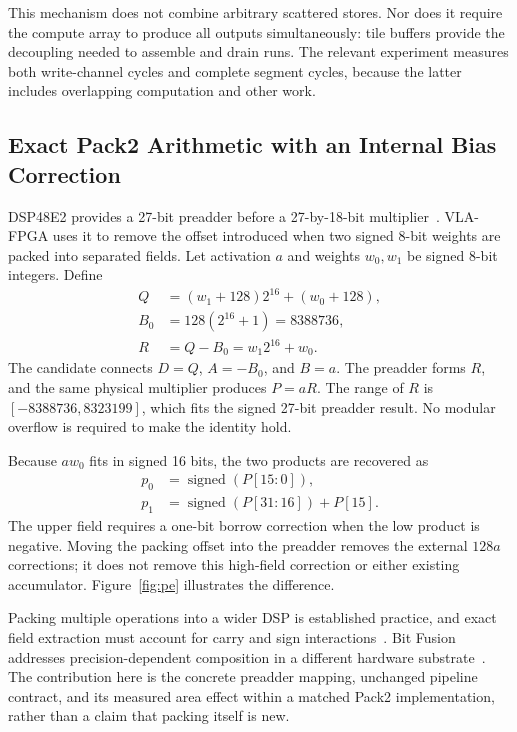 \documentclass[10pt,conference,letterpaper]{IEEEtran}
\begin{document}
This mechanism does not combine arbitrary scattered stores. Nor does it require the compute array to produce all outputs simultaneously: tile buffers provide the decoupling needed to assemble and drain runs. The relevant experiment measures both write-channel cycles and complete segment cycles, because the latter includes overlapping computation and other work.

\subsection{Exact Pack2 Arithmetic with an Internal Bias Correction}
\label{sec:pe}
DSP48E2 provides a 27-bit preadder before a 27-by-18-bit multiplier~\cite{ug579}. VLA-FPGA uses it to remove the offset introduced when two signed 8-bit weights are packed into separated fields. Let activation $a$ and weights $w_0,w_1$ be signed 8-bit integers. Define
\begin{align}
Q&=(w_1+128)2^{16}+(w_0+128),\\
B_0&=128(2^{16}+1)=8388736,\\
R&=Q-B_0=w_1 2^{16}+w_0.
\end{align}
The candidate connects $D=Q$, $A=-B_0$, and $B=a$. The preadder forms $R$, and the same physical multiplier produces $P=aR$. The range of $R$ is $[-8388736,8323199]$, which fits the signed 27-bit preadder result. No modular overflow is required to make the identity hold.

Because $aw_0$ fits in signed 16 bits, the two products are recovered as
\begin{align}
p_0&=\operatorname{signed}(P[15:0]),\\
p_1&=\operatorname{signed}(P[31:16])+P[15].
\label{eq:extract}
\end{align}
The upper field requires a one-bit borrow correction when the low product is negative. Moving the packing offset into the preadder removes the external $128a$ corrections; it does not remove this high-field correction or either existing accumulator. Figure~\ref{fig:pe} illustrates the difference.

Packing multiple operations into a wider DSP is established practice, and exact field extraction must account for carry and sign interactions~\cite{packing}. Bit Fusion addresses precision-dependent composition in a different hardware substrate~\cite{bitfusion}. The contribution here is the concrete preadder mapping, unchanged pipeline contract, and its measured area effect within a matched Pack2 implementation, rather than a claim that packing itself is new.
\end{document}
